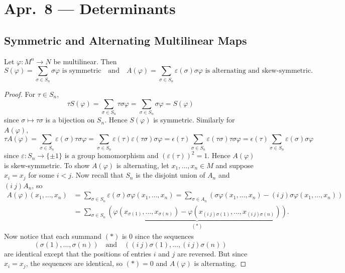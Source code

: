 \chapter{Apr.~8 --- Determinants}

\section{Symmetric and Alternating Multilinear Maps}
\begin{lemma}
  Let $\varphi : M^n \to N$ be multilinear. Then
  \[
    S(\varphi) = \sum_{\sigma \in S_n} \sigma \varphi
    \text{ is symmetric} \quad \text{and} \quad
    A(\varphi) = \sum_{\sigma \in S_n} \varepsilon(\sigma) \sigma \varphi
    \text{ is alternating and skew-symmetric}.
  \]
\end{lemma}

\begin{proof}
  For $\tau \in S_n$,
  \[
    \tau S(\varphi) = \sum_{\sigma \in S_n} \tau \sigma \varphi
    = \sum_{\sigma \in S_n} \sigma \varphi
    = S(\varphi)
  \]
  since $\sigma \mapsto \tau \sigma$ is a bijection
  on $S_n$. Hence $S(\varphi)$ is symmetric. Similarly
  for $A(\varphi)$,
  \[
    \tau A(\varphi) = \sum_{\sigma \in S_n} \varepsilon(\sigma) \tau \sigma \varphi
    = \sum_{\sigma \in S_n} \varepsilon(\tau) \varepsilon(\tau \sigma) \sigma \varphi
    = \epsilon(\tau) \sum_{\sigma \in S_n} \varepsilon(\tau \sigma) \tau \sigma \varphi
    = \epsilon(\tau) \sum_{\sigma \in S_n} \varepsilon(\sigma) \sigma \varphi
  \]
  since $\varepsilon : S_n \to \{\pm 1\}$ is a group
  homomorphism and $(\varepsilon(\tau))^2 = 1$. Hence
  $A(\varphi)$ is
  skew-symmetric. To show $A(\varphi)$ is alternating,
  let $x_1, \dots, x_n \in M$ and suppose
  $x_i = x_j$ for some $i < j$. Now recall that
  $S_n$ is the disjoint union of $A_n$ and
  $(i\ j) A_n$, so
  \begin{align*}
    A(\varphi)(x_1, \dots, x_n)
    &= \sum_{\sigma \in S_n} \varepsilon(\sigma) \sigma \varphi(x_1, \dots, x_n)
    = \sum_{\sigma \in A_n} (\sigma\varphi(x_1, \dots, x_n) - (i\ j) \sigma \varphi(x_1, \dots, x_n)) \\
    &= \sum_{\sigma \in S_n} \underbrace{(\varphi(x_{\sigma(1)}, \dots, x_{\sigma(n)}) - \varphi(x_{(i\ j) \sigma(1)}, \dots, x_{(i\ j)\sigma(n)}))}_{(*)}.
  \end{align*}
  Now notice that each summand $(*)$ is $0$ since
  the sequences
  \[
    (\sigma(1), \dots, \sigma(n)) \quad \text{and} \quad ((i\ j)\sigma(1), \dots, (i\ j)\sigma(n))
  \]
  are identical except that the positions of entries $i$
  and $j$ are reversed. But since $x_i = x_j$, the
  sequences are identical, so $(*) = 0$ and
  $A(\varphi)$ is alternating.
\end{proof}

